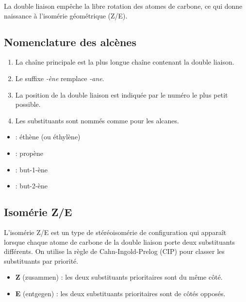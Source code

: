 \begin{remarque}
La double liaison empêche la libre rotation des atomes de carbone, ce qui donne naissance à l'isomérie géométrique (Z/E).
\end{remarque}

\subsection{Nomenclature des alcènes}

\begin{loi}
\begin{enumerate}
    \item La chaîne principale est la plus longue chaîne contenant la double liaison.
    \item Le suffixe \textit{-ène} remplace \textit{-ane}.
    \item La position de la double liaison est indiquée par le numéro le plus petit possible.
    \item Les substituants sont nommés comme pour les alcanes.
\end{enumerate}
\end{loi}

\begin{exemple}
\begin{itemize}
    \item {} : éthène (ou éthylène)
    \item {} : propène
    \item {} : but-1-ène
    \item {} : but-2-ène
\end{itemize}
\end{exemple}

\subsection{Isomérie Z/E}

\begin{definition}[Isomérie Z/E]
L'isomérie Z/E est un type de stéréoisomérie de configuration qui apparaît lorsque chaque atome de carbone de la double liaison porte deux substituants différents. On utilise la règle de Cahn-Ingold-Prelog (CIP) pour classer les substituants par priorité.
\begin{itemize}
    \item \textbf{Z} (zusammen) : les deux substituants prioritaires sont du même côté.
    \item \textbf{E} (entgegen) : les deux substituants prioritaires sont de côtés opposés.
\end{itemize}
\end{definition}

